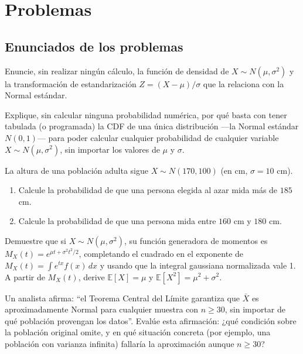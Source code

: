 \section*{Problemas}

\subsection*{Enunciados de los problemas}

\begin{problema}
	\label{prob:6f58870}
	Enuncie, sin realizar ningún cálculo, la función de densidad de $X \sim N(\mu,\sigma^2)$ y la transformación de estandarización $Z=(X-\mu)/\sigma$ que la relaciona con la Normal estándar.
\end{problema}

\begin{problema}
	\label{prob:74e7285}
	Explique, sin calcular ninguna probabilidad numérica, por qué basta con tener tabulada (o programada) la CDF de una única distribución —la Normal estándar $N(0,1)$— para poder calcular cualquier probabilidad de cualquier variable $X \sim N(\mu,\sigma^2)$, sin importar los valores de $\mu$ y $\sigma$.
\end{problema}

\begin{problema}
	\label{prob:48f2103}
	La altura de una población adulta sigue $X \sim N(170, 100)$ (en cm, $\sigma=10$ cm).
	\begin{enumerate}
		\item Calcule la probabilidad de que una persona elegida al azar mida más de $185$ cm.
		\item Calcule la probabilidad de que una persona mida entre $160$ cm y $180$ cm.
	\end{enumerate}
\end{problema}

\begin{problema}
	\label{prob:dd1e027}
	Demuestre que si $X \sim N(\mu,\sigma^2)$, su función generadora de momentos es $M_X(t) = e^{\mu t + \sigma^2t^2/2}$, completando el cuadrado en el exponente de $M_X(t) = \int e^{tx}f(x)\,dx$ y usando que la integral gaussiana normalizada vale 1. A partir de $M_X(t)$, derive $\mathbb{E}[X]=\mu$ y $\mathbb{E}[X^2]=\mu^2+\sigma^2$.
\end{problema}

\begin{problema}
	\label{prob:96d8f57}
	Un analista afirma: ``el Teorema Central del Límite garantiza que $\bar{X}$ es aproximadamente Normal para cualquier muestra con $n\ge30$, sin importar de qué población provengan los datos''. Evalúe esta afirmación: ¿qué condición sobre la población original omite, y en qué situación concreta (por ejemplo, una población con varianza infinita) fallaría la aproximación aunque $n\ge30$?
\end{problema}

